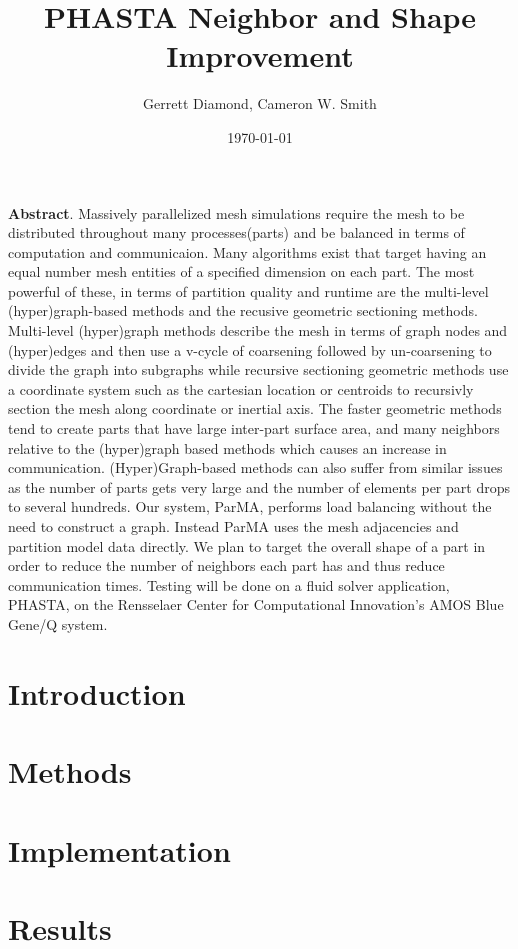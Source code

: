 \documentclass[a4paper]{article}
\title{PHASTA Neighbor and Shape Improvement}
\author{Gerrett Diamond, Cameron W. Smith}
\date{\today}
\begin{document}
\maketitle

\textbf{Abstract}. Massively parallelized mesh simulations require the mesh to be distributed throughout many processes(parts) and be balanced in terms of computation and communicaion. Many algorithms exist that target having an equal number mesh entities of a specified dimension on each part. The most powerful of these, in terms of partition quality and runtime are the multi-level (hyper)graph-based methods and the recusive geometric sectioning methods.  Multi-level (hyper)graph methods describe the mesh in terms of graph nodes and (hyper)edges and then use a v-cycle of coarsening followed by un-coarsening to divide the graph into subgraphs while recursive sectioning geometric methods use a coordinate system such as the cartesian location or centroids to recursivly section the mesh along coordinate or inertial axis. The faster geometric methods tend to create parts that have large inter-part surface area, and many neighbors relative to the (hyper)graph based methods which causes an increase in communication. (Hyper)Graph-based methods can also suffer from similar issues as the number of parts gets very large and the number of elements per part drops to several hundreds. Our system, ParMA, performs load balancing without the need to construct a graph. Instead ParMA uses the mesh adjacencies and partition model data directly. We plan to target the overall shape of a part in order to reduce the number of neighbors each part has and thus reduce communication times. Testing will be done on a fluid solver application, PHASTA, on the Rensselaer Center for Computational Innovation's AMOS Blue Gene/Q system.
 
\section{Introduction}

\section{Methods}


\section{Implementation}

\section{Results}

\newpage


\end{document}
